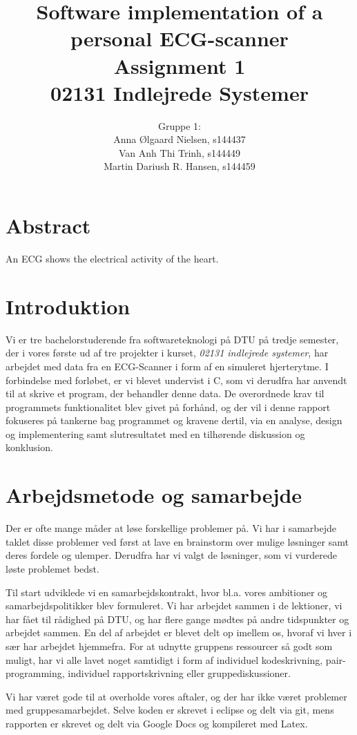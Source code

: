 \documentclass{article}
\title{\huge Software implementation of a personal ECG-scanner \\ \LARGE Assignment 1 \\ \LARGE 02131 Indlejrede Systemer}
\author{Gruppe 1: \\Anna Ølgaard Nielsen, s144437 \\ Van Anh Thi Trinh, s144449 \\ Martin Dariush R. Hansen, s144459}
\date{\myfont \displaydate{date}}
\begin{document}
\maketitle

\newpage

\section*{Abstract}
An ECG shows the electrical activity of the heart. 

\tableofcontents

\newpage
\section{Introduktion}
Vi er tre bachelorstuderende fra softwareteknologi på DTU på tredje semester, der i vores første ud af tre projekter i kurset, \textit{02131 indlejrede systemer}, har arbejdet med data fra en ECG-Scanner i form af en simuleret hjerterytme. I forbindelse med forløbet, er vi blevet undervist i C, som vi derudfra har anvendt til at skrive et program, der behandler denne data. De overordnede krav til programmets funktionalitet blev givet på forhånd, og der vil i denne rapport fokuseres på tankerne bag programmet og kravene dertil, via en analyse, design og implementering samt slutresultatet med en tilhørende diskussion og konklusion.


\newpage
\section{Arbejdsmetode og samarbejde}
Der er ofte mange måder at løse forskellige problemer på. Vi har i samarbejde taklet disse problemer ved først at lave en brainstorm over mulige løsninger samt deres fordele og ulemper. Derudfra har vi valgt de løsninger, som vi vurderede løste problemet bedst.

Til start udviklede vi en samarbejdskontrakt, hvor bl.a. vores ambitioner og samarbejdspolitikker blev formuleret. Vi har arbejdet sammen i de lektioner, vi har fået til rådighed på DTU, og har flere gange mødtes på andre tidspunkter og arbejdet sammen. En del af arbejdet er blevet delt op imellem os, hvoraf vi hver i sær har arbejdet hjemmefra. For at udnytte gruppens ressourcer så godt som muligt, har vi alle lavet noget samtidigt i form af individuel kodeskrivning, pair-programming, individuel rapportskrivning eller gruppediskussioner.

Vi har været gode til at overholde vores aftaler, og der har ikke været problemer med gruppesamarbejdet. Selve koden er skrevet i eclipse og delt via git, mens rapporten er skrevet og delt via Google Docs og kompileret med Latex.
\end{document}
